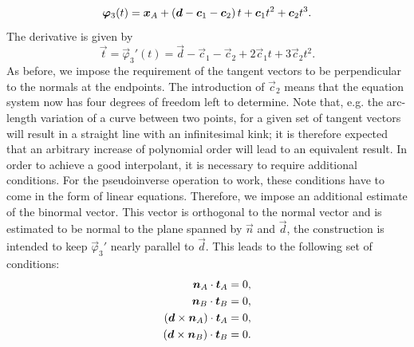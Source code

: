 \documentclass[twocolumn]{biophys-new}
\begin{document}
\begin{equation}
  \bm{\varphi}_3(t)
  =
  \bm{x}_A + \left( \bm{d} - \bm{c}_1 - \bm{c}_2 \right) t + \bm{c}_1 t^2 + \bm{c}_2 t^3.
\end{equation}
The derivative is given by
\begin{equation}
  \vec{t} = \vec{\varphi}_3'(t) = \vec{d} - \vec{c}_1 - \vec{c}_2 + 2 \vec{c}_1 t + 3 \vec{c}_2 t^2.
\end{equation}
As before, we impose the requirement of the tangent vectors to be perpendicular to the normals at the endpoints. The introduction of $\vec{c}_2$ means that the equation system now has four degrees of freedom left to determine. Note that, e.g. the arc-length variation of a curve between two points, for a given set of tangent vectors will result in a straight line with an infinitesimal kink; it is therefore expected that an arbitrary increase of polynomial order will lead to an equivalent result. In order to achieve a good interpolant, it is necessary to require additional conditions. For the pseudoinverse operation to work, these conditions have to come in the form of linear equations.
Therefore, we impose an additional estimate of the binormal vector. This vector is orthogonal to the normal vector and is estimated to be normal to the plane spanned by $\vec{n}$ and $\vec{d}$, the construction is intended to keep $\vec{\varphi}_3'$ nearly parallel to $\vec{d}$. This leads to the following set of conditions:
\begin{subequations}
  \begin{align}
    \bm{n}_A \cdot \bm{t}_A &= 0,
    \\
    \bm{n}_B \cdot \bm{t}_B &= 0,
    \\
    \left( \bm{d} \times \bm{n}_A \right) \cdot \bm{t}_A &= 0,
    \\
    \left( \bm{d} \times \bm{n}_B \right) \cdot \bm{t}_B &= 0.
  \end{align}
\end{subequations}
\end{document}
